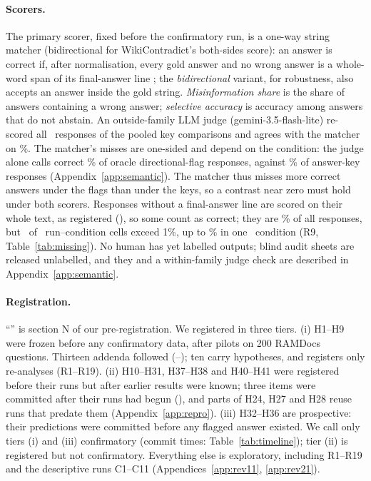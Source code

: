 \paragraph{Scorers.}
The primary scorer, fixed before the confirmatory run, is a one-way string matcher (bidirectional for WikiContradict's
both-sides score): an answer is correct if, after
normalisation, every gold answer and no wrong answer is a whole-word span of its final-answer line
\citep{wang2025madam}; the \emph{bidirectional} variant, for robustness, also accepts an answer inside the gold
string. \emph{Misinformation share} is the share of answers containing a wrong answer;
\emph{selective accuracy} is accuracy among answers that do not abstain. An outside-family LLM judge
(gemini-3.5-flash-lite) re-scored all \jdN\ responses of the pooled key comparisons and agrees with the matcher on
\jdAgree\%. The matcher's misses are one-sided and depend on the condition: the judge alone calls correct
\scJudgeOnlyOracleDir\% of oracle directional-flag responses, against \scJudgeOnlyAnswerKey\% of answer-key
responses (Appendix~\ref{app:semantic}). The
matcher thus misses more correct answers under the flags than under the keys, so a contrast near zero must hold under
both scorers. Responses without a final-answer line are scored on their whole text, as registered (), so some count as
correct; they are \missShare\% of all responses, but
\missCellsAbove\ of \missCells\ run--condition cells exceed 1\%, up to \missTopShare\% in one \missTopModel\ condition
(R9, Table~\ref{tab:missing}). No human has yet labelled outputs; blind audit sheets are released unlabelled, and they and a within-family judge
check are described in Appendix~\ref{app:semantic}.

\paragraph{Registration.}
``'' is section N of our pre-registration. We registered in three tiers. (i) H1--H9 were frozen
before any confirmatory data, after pilots on 200 RAMDocs questions. Thirteen addenda followed (--); ten
carry hypotheses, and  registers only re-analyses (R1--R19). (ii) H10--H31, H37--H38 and H40--H41 were registered before their runs but after earlier results were
known; three items were committed after their runs had begun (), and parts of H24, H27 and H28 reuse runs that
predate them (Appendix~\ref{app:repro}). (iii) H32--H36 are prospective: their
predictions were committed before any flagged answer existed. We call only tiers (i) and (iii) confirmatory (commit times: Table~\ref{tab:timeline}); tier (ii) is registered but
not confirmatory. Everything else is exploratory, including R1--R19 and the descriptive  runs C1--C11
(Appendices~\ref{app:rev11}, \ref{app:rev21}).

